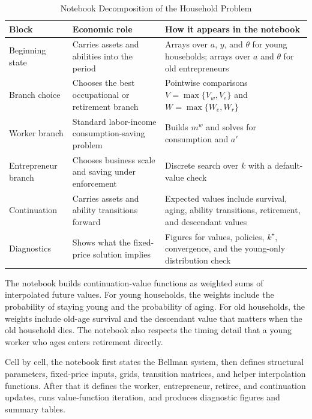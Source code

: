 \documentclass[\latexroot/\projectname]{subfiles}
\begin{document}
\begin{table}[htbp]
  \centering
  \caption{Notebook Decomposition of the Household Problem}
  \whenintegrated{\label{tab:decomposition}}
  \begin{tabular}{p{}p{}p{}}
    \hline\hline
    Block & Economic role & How it appears in the notebook \\
    \hline
    Beginning state & Carries assets and abilities into the period & Arrays over $a$, $y$, and $\theta$ for young households; arrays over $a$ and $\theta$ for old entrepreneurs \\
    Branch choice & Chooses the best occupational or retirement branch & Pointwise comparisons $V=\max\{V_w,V_e\}$ and $W=\max\{W_e,W_r\}$ \\
    Worker branch & Standard labor-income consumption-saving problem & Builds $m^w$ and solves for consumption and $a'$ \\
    Entrepreneur branch & Chooses business scale and saving under enforcement & Discrete search over $k$ with a default-value check \\
    Continuation & Carries assets and ability transitions forward & Expected values include survival, aging, ability transitions, retirement, and descendant values \\
    Diagnostics & Shows what the fixed-price solution implies & Figures for values, policies, $k^\star$, convergence, and the young-only distribution check \\
    \hline
  \end{tabular}
\end{table}

The notebook builds continuation-value functions as weighted sums of interpolated future values. For young households, the weights include the probability of staying young and the probability of aging. For old households, the weights include old-age survival and the descendant value that matters when the old household dies. The notebook also respects the timing detail that a young worker who ages enters retirement directly.

Cell by cell, the notebook first states the Bellman system, then defines structural parameters, fixed-price inputs, grids, transition matrices, and helper interpolation functions. After that it defines the worker, entrepreneur, retiree, and continuation updates, runs value-function iteration, and produces diagnostic figures and summary tables.

\smartbib
\end{document}
